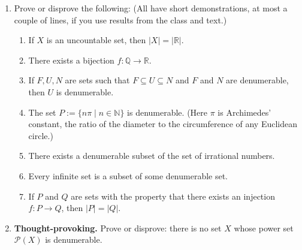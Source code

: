 \documentclass[12pt]{article}
\newcommand{\RR}{{\mathbb R}}  %
\newcommand{\NN}{{\mathbb N}}  %
\newcommand{\QQ}{{\mathbb Q}}  %
\begin{document}
\begin{enumerate}
\item Prove or disprove the following:   (All have short demonstrations, at most a couple of lines, if you use results from
  the class and text.)
 \begin{enumerate}

  \item If $X$ is an uncountable set, then $|X|=|\RR|$.

  \item There exists a bijection $f\colon \QQ\to\RR$.

  \item If $F,U,N$ are sets such that $F\subseteq U\subseteq N$ and $F$ and $N$ are denumerable, then $U$ is denumerable.

  \item The set $P:=\{ n\pi\mid n\in \NN\}$ is denumerable.  (Here $\pi$ is Archimedes' constant, the ratio of the diameter
    to the circumference of any Euclidean circle.)

  \item There exists a denumerable subset of the set of irrational numbers.

  \item Every infinite set is a subset of some denumerable set.

  \item If $P$ and $Q$ are sets with the property that there exists an injection $f\colon P\to Q$, then $|P|=|Q|$.

 \end{enumerate} 
 

\item {\bf Thought-provoking.}
  Prove or disprove: there is no set $X$ whose power set ${\mathcal P}(X)$ is denumerable.


\end{enumerate}
\end{document}
